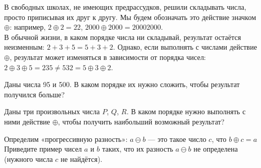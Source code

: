 ﻿
\noindent В свободных школах, не имеющих предрассудков, решили складывать числа, просто приписывая их друг к другу. Мы будем обозначать это действие значком $\oplus$: например, $2 \oplus 2 = 22$, $2000 \oplus 2000 = 20002000$. \smallskip\\
В обычной жизни, в каком порядке числа ни складывай, результат остаётся неизменным: $2+3+5 = 5+3+2$. Однако, если выполнять с числами действие $\oplus$, результат может изменяться в зависимости от порядка чисел: $2 \oplus 3 \oplus 5 = 235 \ne 532 = 5 \oplus 3 \oplus 2$.

\begin{enumerate}
\itA Даны числа 95 и 500. В каком порядке их нужно сложить, чтобы результат получился больше?

\itB Даны три произвольных числа $P$, $Q$, $R$. В каком порядке нужно выполнять с ними действие $\oplus$, чтобы получить наибольший возможный результат?

\itC Определим «прогрессивную разность»: $a \ominus b$ — это такое число $c$, что $b \oplus c = a$ Приведите пример чисел $a$ и $b$ таких, что их разность $a \ominus b$ не определена (нужного числа $c$ не найдётся).
\end{enumerate}